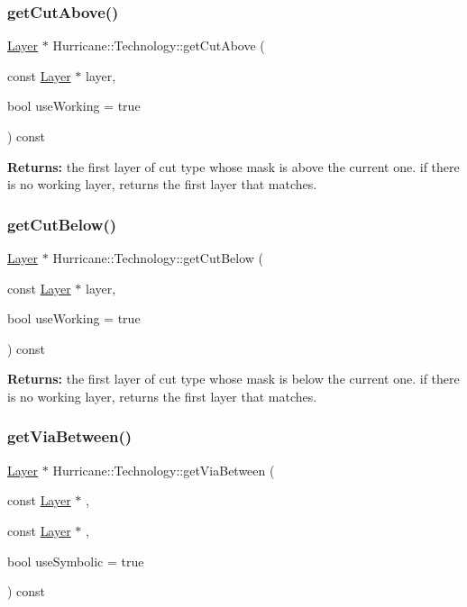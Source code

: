 \subsubsection{\texorpdfstring{get\+Cut\+Above()}{getCutAbove()}}
{\footnotesize\ttfamily \mbox{\hyperlink{classHurricane_1_1Layer}{Layer}} $\ast$ Hurricane\+::\+Technology\+::get\+Cut\+Above (\begin{DoxyParamCaption}\item[{const \mbox{\hyperlink{classHurricane_1_1Layer}{Layer}} $\ast$}]{layer,  }\item[{bool}]{use\+Working = {\ttfamily true} }\end{DoxyParamCaption}) const}

{\bfseries Returns\+:} the first layer of cut type whose mask is above the current one. if there is no working layer, returns the first layer that matches. \mbox{\label{classHurricane_1_1Technology_a3ca39dccc7e19b404181f55777e1b933}} 
\subsubsection{\texorpdfstring{get\+Cut\+Below()}{getCutBelow()}}
{\footnotesize\ttfamily \mbox{\hyperlink{classHurricane_1_1Layer}{Layer}} $\ast$ Hurricane\+::\+Technology\+::get\+Cut\+Below (\begin{DoxyParamCaption}\item[{const \mbox{\hyperlink{classHurricane_1_1Layer}{Layer}} $\ast$}]{layer,  }\item[{bool}]{use\+Working = {\ttfamily true} }\end{DoxyParamCaption}) const}

{\bfseries Returns\+:} the first layer of cut type whose mask is below the current one. if there is no working layer, returns the first layer that matches. \mbox{\label{classHurricane_1_1Technology_a8209708bc594a307ea39f15a39bbf196}} 
\subsubsection{\texorpdfstring{get\+Via\+Between()}{getViaBetween()}}
{\footnotesize\ttfamily \mbox{\hyperlink{classHurricane_1_1Layer}{Layer}} $\ast$ Hurricane\+::\+Technology\+::get\+Via\+Between (\begin{DoxyParamCaption}\item[{const \mbox{\hyperlink{classHurricane_1_1Layer}{Layer}} $\ast$}]{,  }\item[{const \mbox{\hyperlink{classHurricane_1_1Layer}{Layer}} $\ast$}]{,  }\item[{bool}]{use\+Symbolic = {\ttfamily true} }\end{DoxyParamCaption}) const}


